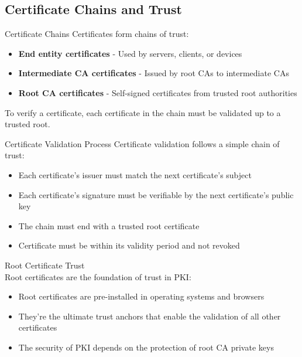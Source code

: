 \subsection{Certificate Chains and Trust}

\begin{concept}{Certificate Chains}
Certificates form chains of trust:
\begin{itemize}
    \item \textbf{End entity certificates} - Used by servers, clients, or devices
    \item \textbf{Intermediate CA certificates} - Issued by root CAs to intermediate CAs
    \item \textbf{Root CA certificates} - Self-signed certificates from trusted root authorities
\end{itemize}
To verify a certificate, each certificate in the chain must be validated up to a trusted root.
\end{concept}

\begin{concept}{Certificate Validation Process}
Certificate validation follows a simple chain of trust:
\begin{itemize}
    \item Each certificate's issuer must match the next certificate's subject
    \item Each certificate's signature must be verifiable by the next certificate's public key
    \item The chain must end with a trusted root certificate
    \item Certificate must be within its validity period and not revoked
\end{itemize}
\end{concept}

\begin{theorem}{Root Certificate Trust}\\
Root certificates are the foundation of trust in PKI:
\begin{itemize}
    \item Root certificates are pre-installed in operating systems and browsers
    \item They're the ultimate trust anchors that enable the validation of all other certificates
    \item The security of PKI depends on the protection of root CA private keys
\end{itemize}
\end{theorem}



